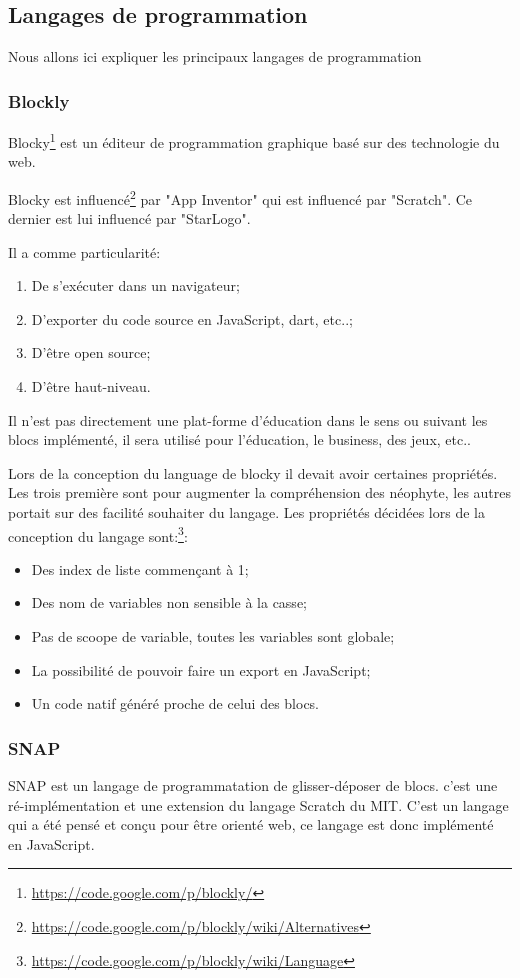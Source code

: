 \subsection{Langages de programmation}
Nous allons ici expliquer les principaux langages de programmation 
\subsubsection{Blockly}
\label{blockly}
Blocky\footnote{\url{https://code.google.com/p/blockly/}} est un éditeur de programmation graphique basé sur des technologie du web. 

Blocky est influencé\footnote{\url{https://code.google.com/p/blockly/wiki/Alternatives}} par "App Inventor" qui est influencé par "Scratch". Ce dernier est lui influencé par "StarLogo".

Il a comme particularité:
\begin{enumerate}
\item De s'exécuter dans un navigateur;
\item D'exporter du code source en JavaScript, dart, etc..;
\item D'être open source;
\item D'être haut-niveau.
\end{enumerate}

Il n'est pas directement une plat-forme d'éducation dans le sens ou suivant les blocs implémenté, il sera utilisé pour l'éducation, le business, des jeux, etc..


Lors de la conception du language de blocky il devait avoir certaines propriétés. Les trois première sont pour augmenter la compréhension des néophyte, les autres portait sur des facilité souhaiter du langage. Les propriétés décidées lors de la conception du langage sont:\footnote{\url{https://code.google.com/p/blockly/wiki/Language}}:

\begin{itemize}
  \item Des index de liste commençant à 1;
  \item Des nom de variables non sensible à la casse;
  \item Pas de scoope de variable, toutes les variables sont globale;
  \item La possibilité de pouvoir faire un export en JavaScript;
  \item Un code natif généré proche de celui des blocs.
\end{itemize}

\subsubsection{SNAP}
SNAP est un langage de programmatation de glisser-déposer de blocs. c'est une ré-implémentation et une extension du langage Scratch du MIT. C'est un langage qui a été pensé et conçu pour être orienté web, ce langage est donc implémenté en JavaScript.\\


